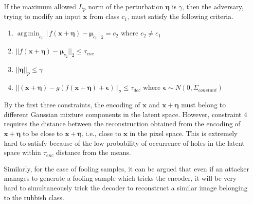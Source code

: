 \documentclass[letterpaper]{article} %
\DeclareMathOperator*{\argmin}{arg\,min}
\begin{document}
If the maximum allowed $L_{p}$ norm of the perturbation $\boldsymbol{\eta}$ is $\gamma$, then the adversary, trying to modify an input $\mathbf{x}$ from class $c_{1}$, must satisfy the following criteria.
\begin{enumerate}[leftmargin=1cm]
\setlength\itemsep{0em}
\item $\argmin_{c_i}|| f(\mathbf{x}+\boldsymbol{\eta}) - \boldsymbol{\mu}_{c_i} ||_{2} = c_{2}$ where $ c_{2}\neq c_{1}$
\item $ || f(\mathbf{x}+\boldsymbol{\eta}) - \boldsymbol{\mu}_{c_{2}} ||_{2} \leq \tau_{enc} $
\item $||\boldsymbol{\eta}||_{p} \leq \gamma$
\item $|| (\mathbf{x}+\boldsymbol{\eta}) - g(f(\mathbf{x}+\boldsymbol{\eta}) + \boldsymbol{\epsilon}) ||_{2} \leq \tau_{dec}$ where $\boldsymbol{\epsilon} \sim N(0, \Sigma_{constant})$
\end{enumerate}
By the first three constraints, the encoding of $\mathbf{x}$ and $\mathbf{x}+\boldsymbol{\eta}$ must belong to different Gaussian mixture components in the latent space. However, constraint $4$ requires the distance between the reconstruction obtained from the encoding of $\mathbf{x}+\boldsymbol{\eta}$ to be close to $\mathbf{x}+\boldsymbol{\eta}$, i.e., close to $\mathbf{x}$ in the pixel space. This is extremely hard to satisfy because of the low probability of occurrence of holes in the latent space within $\tau_{enc}$ distance from the means.

Similarly, for the case of fooling samples, it can be argued that even if an attacker manages to generate a fooling sample which tricks the encoder, it will be very hard to simultaneously trick the decoder to reconstruct a similar image belonging to the rubbish class.
\end{document}
